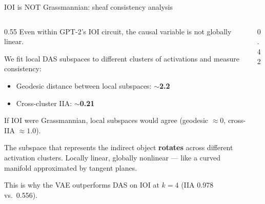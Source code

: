 \documentclass[aspectratio=169,11pt]{beamer}
\begin{document}
\begin{frame}{IOI is NOT Grassmannian: sheaf consistency analysis}

\begin{columns}[T]
\begin{column}{0.55\textwidth}
{\small Even within GPT-2's IOI circuit, the causal variable is not globally linear.}

\vspace{0.3em}
{\small We fit local DAS subspaces to different clusters of activations and measure consistency:}

\vspace{0.3em}
\begin{itemize}
  \item {\small Geodesic distance between local subspaces: \textbf{$\sim$2.2}}
  \item {\small Cross-cluster IIA: \textbf{$\sim$0.21}}
\end{itemize}

\vspace{0.3em}
{\small If IOI were Grassmannian, local subspaces would agree (geodesic $\approx 0$, cross-IIA $\approx 1.0$).}

\vspace{0.3em}
{\small The subspace that represents the indirect object \textbf{rotates} across different activation clusters. Locally linear, globally nonlinear --- like a curved manifold approximated by tangent planes.}

\vspace{0.3em}
{\small This is why the VAE outperforms DAS on IOI at $k = 4$ (IIA 0.978 vs.\ 0.556).}
\end{column}
\begin{column}{0.42\textwidth}
\end{column}
\end{columns}
\end{frame}
\end{document}
